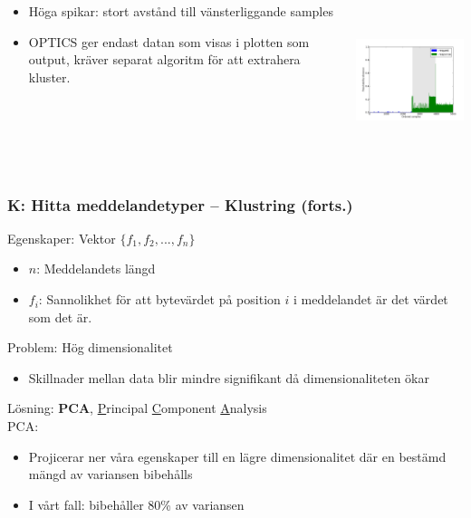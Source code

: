 \documentclass[xetex, 8pt]{beamer}
\begin{document}
\begin{frame}
\begin{columns}[t]
\begin{column}[T]{6cm}
\begin{itemize}
                    \item Höga spikar: stort avstånd till vänsterliggande samples
                    \item OPTICS ger endast datan som visas i plotten som output,
                        kräver separat algoritm för att extrahera kluster.
                \end{itemize}
            \end{column}
            \begin{column}[T]{6cm}
                \includegraphics[height=4.5cm]{img/hierextr.pdf}
            \end{column}
        \end{columns}
    \end{frame}
    \begin{frame}
        \frametitle{K: Hitta meddelandetyper -- Klustring (forts.)}
        Egenskaper: Vektor $\{f_1, f_2, ..., f_n\}$
        \begin{itemize}
            \item $n$: Meddelandets längd
            \item $f_i$: Sannolikhet för att bytevärdet på position $i$ i
                meddelandet är det värdet som det är.
        \end{itemize}
        \vskip20pt
        Problem: Hög dimensionalitet \\
        \begin{itemize}
            \item Skillnader mellan data blir mindre signifikant då
                dimensionaliteten ökar
        \end{itemize}
        Lösning: \textbf{PCA}, \scriptsize{\underline{P}rincipal
            \underline{C}omponent \underline{A}nalysis} \\
        PCA:
        \begin{itemize}
            \item Projicerar ner våra egenskaper till en lägre dimensionalitet
                där en bestämd mängd av variansen bibehålls
            \item I vårt fall: bibehåller 80\% av variansen
        \end{itemize}
    \end{frame}
\end{document}
